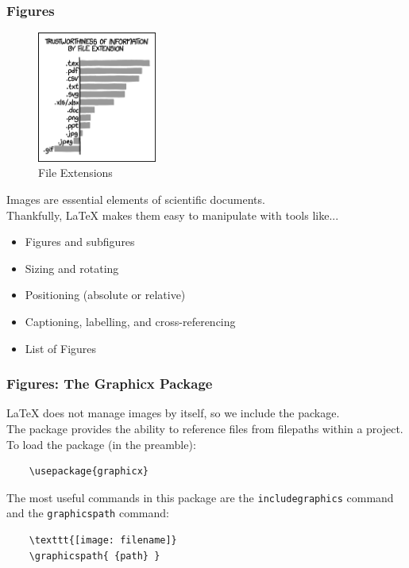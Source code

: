 \begin{frame}[fragile]
\frametitle{Figures}
    \begin{figure}
        \centering
        \includegraphics[width=0.35\textwidth]{img/xkcd1301_file_extensions.png}
        \caption{File Extensions}
        \label{fig:xkcd1301}
    \end{figure}
    Images are essential elements of scientific documents. \\
    Thankfully, \LaTeX{} makes them easy to manipulate with tools like... \pause
    \begin{itemize}[$\bullet$]
        \item Figures and subfigures \pause
        \item Sizing and rotating \pause
        \item Positioning (absolute or relative) \pause
        \item Captioning, labelling, and cross-referencing \pause
        \item  List of Figures
    \end{itemize}
\end{frame}


\begin{frame}[fragile]
\frametitle{Figures: The Graphicx Package}
\LaTeX{} does not manage images by itself, so we include the  package. \\ \pause
The  package provides the ability to reference files from filepaths within a project. \\[\baselineskip] \pause
To load the package (in the preamble):
\begin{exampleblock}{}
    \begin{verbatim}
    \usepackage{graphicx}
    \end{verbatim}
\end{exampleblock} \pause
\vspace{0.2cm}
The most useful commands in this package are the \texttt{includegraphics} command and the \texttt{graphicspath} command:
\begin{exampleblock}{}
    \begin{verbatim}
    \texttt{[image: filename]}
    \graphicspath{ {path} }
    \end{verbatim}
\end{exampleblock}
\end{frame}


